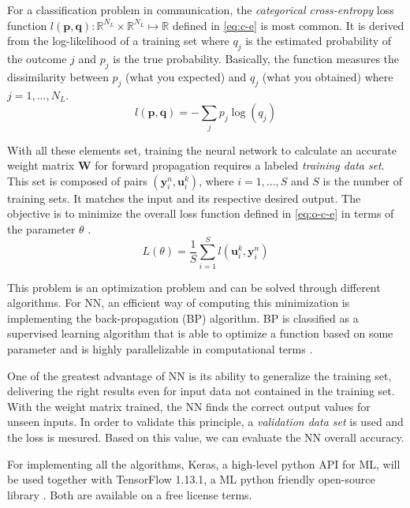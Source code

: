 \documentclass[conference]{IEEEtran}
\begin{document}
For a classification problem in communication, the \textit{categorical cross-entropy} loss function $l(\textbf{p},\textbf{q}):\mathbb{R} ^{N_L}\times \mathbb{R} ^{N_L}\mapsto \mathbb{R}$ defined in \eqref{eq:c-e} is most common. It is derived from the log-likelihood of a training set where $q_j$ is the estimated probability of the outcome $j$ and $p_{j}$ is the true probability. Basically, the function measures the dissimilarity between $p_{j}$ (what you expected) and $q_{j}$ (what you obtained) \cite{b10} where $j=1,...,N_L$.
\begin{equation}\label{eq:c-e}
	l(\textbf{p},\textbf{q})=-\sum _{j}p_{j}\log \left( q_{j}\right)
\end{equation}

With all these elements set, training the neural network to calculate an accurate weight matrix $\textbf{W}$ for forward propagation requires a labeled \textit{training data set}. This set is composed of pairs $ (\textbf{y}_{i}^{n}, {\mathbf{u}}_i^k) $, where $i=1,...,S$ and $S$ is the number of training sets. It matches the input and its respective desired output. The objective is to minimize the overall loss function defined in \eqref{eq:o-c-e} in terms of the parameter $\theta$ \cite{b2}. 
\begin{equation}\label{eq:o-c-e}
L\left( \theta \right) =\dfrac {1}{S}\sum ^{S}_{i=1}l\left({\mathbf{u}}_i^k  , \textbf{y}_{i}^{n}\right)	
\end{equation}  

This problem is an optimization problem and can be solved through different algorithms. For NN, an efficient way of computing this minimization is implementing the back-propagation (BP) algorithm. 	BP is classified as a supervised learning algorithm that is able to optimize a function based on some parameter and is highly parallelizable in computational terms \cite{b9}\cite{b8}.

One of the greatest advantage of NN is its ability to generalize the training set, delivering the right results even for input data not contained in the training set. With the weight matrix trained, the NN finds the correct output values for unseen inputs. In order to validate this principle, a \textit{validation data set} is used and the loss is mesured. Based on this value, we can evaluate the NN overall accuracy.

For implementing all the algorithms, Keras, a high-level python API for ML, will be used together with TensorFlow 1.13.1, a ML python friendly open-source library \cite{b11} \cite{b12}. Both are available on a free license terms.
\end{document}
